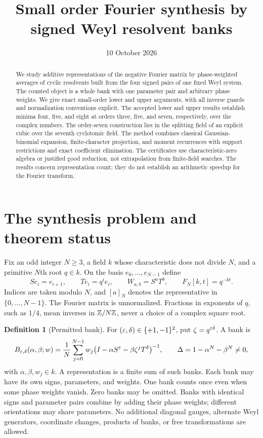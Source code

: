 \documentclass[11pt,letterpaper]{article}
\title{Small order Fourier synthesis by signed Weyl resolvent banks}
\author{}
\date{10 October 2026}
\theoremstyle{definition}\newtheorem{definition}[theorem]{Definition}
\begin{document}
\maketitle
\begin{abstract}
We study additive representations of the negative Fourier matrix by phase-weighted averages of cyclic resolvents built from the four signed pairs of one fixed Weyl system. The counted object is a whole bank with one parameter pair and arbitrary phase weights. We give exact small-order lower and upper arguments, with all inverse guards and normalization conventions explicit. The accepted lower and upper results establish minima four, five, and eight at orders three, five, and seven, respectively, over the complex numbers. The order-seven construction lies in the splitting field of an explicit cubic over the seventh cyclotomic field. The method combines classical Gaussian-binomial expansion, finite-character projection, and moment recurrences with support restrictions and exact coefficient elimination. The certificates use characteristic-zero algebra or justified good reduction, not extrapolation from finite-field searches. The results concern representation count; they do not establish an arithmetic speedup for the Fourier transform.
\end{abstract}

\section{The synthesis problem and theorem status}

Fix an odd integer $N\geq3$, a field $k$ whose characteristic does not divide $N$, and a primitive $N$th root $q\in k$. On the basis $e_0,\ldots,e_{N-1}$ define
\[
S e_i=e_{i+1},\qquad T e_i=q^i e_i,\qquad W_{a,b}=S^aT^b,
\qquad F_N[k,t]=q^{-kt}.
\]
Indices are taken modulo $N$, and $[a]_N$ denotes the representative in $\{0,\ldots,N-1\}$. The Fourier matrix is unnormalized. Fractions in exponents of $q$, such as $1/4$, mean inverses in $\mathbb Z/N\mathbb Z$, never a choice of a complex square root.

\begin{definition}[Permitted bank]
For $(\varepsilon,\delta)\in\{+1,-1\}^2$, put $\zeta=q^{\varepsilon\delta}$. A bank is
\begin{equation}\label{eq:bank}
 B_{\varepsilon,\delta}(\alpha,\beta;w)
 =\frac1N\sum_{j=0}^{N-1} w_j
 \bigl(I-\alpha S^\varepsilon-\beta\zeta^j T^\delta\bigr)^{-1},
 \qquad \Delta=1-\alpha^N-\beta^N\ne0,
\end{equation}
with $\alpha,\beta,w_j\in k$. A representation is a finite sum of such banks. Each bank may have its own signs, parameters, and weights. One bank counts once even when some phase weights vanish. Zero banks may be omitted. Banks with identical signs and parameter pairs combine by adding their phase weights; different orientations may share parameters. No additional diagonal gauges, alternate Weyl generators, coordinate changes, products of banks, or free transformations are allowed.
\end{definition}
\end{document}
